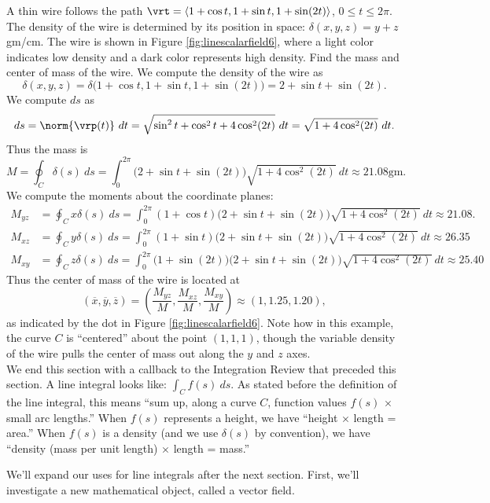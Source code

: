 {A thin wire follows the path $\vrt = \langle 1+\cos t,1+\sin t, 1+ \sin(2t)\rangle$, $0\leq t\leq 2\pi$. The density of the wire is determined by its position in space: $\delta(x,y,z) = y+z$ gm/cm. The wire is shown in Figure \ref{fig:linescalarfield6}, where a light color indicates low density and a dark color represents high density. Find the mass  and center of mass of the wire.
}
{We compute the density of the wire as 
$$\delta(x,y,z) = \delta\big(1+\cos t,1+\sin t, 1+\sin(2t)\big) = 2+\sin t+\sin(2t).$$ We compute $ds$ as
$$ds = \norm{\vrp(t)}\ dt = \sqrt{\sin^2t+\cos^2t+4\cos^2(2t)}\ dt = \sqrt{1+4\cos^2(2t)}\ dt.$$
Thus the mass is
$$M = \oint_C \delta(s)\ ds = \int_0^{2\pi} \big(2+\sin t+\sin(2t)\big)\sqrt{1+4\cos^2(2t)}\ dt \approx 21.08\text{gm}. $$
We compute the moments about the coordinate planes:
\begin{align*}
M_{yz} &= \oint_C x\delta(s)\ ds = \int_0^{2\pi}(1+\cos t)\big(2+\sin t+\sin(2t)\big)\sqrt{1+4\cos^2(2t)}\ dt \approx 21.08. \\
M_{xz} &= \oint_C y\delta(s)\ ds = \int_0^{2\pi}(1+\sin t)\big(2+\sin t+\sin(2t)\big)\sqrt{1+4\cos^2(2t)}\ dt \approx
26.35\\
M_{xy} &= \oint_C z\delta(s)\ ds = \int_0^{2\pi}\big(1+\sin(2 t)\big)\big(2+\sin t+\sin(2t)\big)\sqrt{1+4\cos^2(2t)}\ dt \approx 25.40
\end{align*}
Thus the center of mass of the wire is located at 
$$(\overline{x},\overline{y},\overline{z}) = \left(\frac{M_{yz}}M, \frac{M_{xz}}M,\frac{M_{xy}}M\right) \approx (1,1.25,1.20),$$
as indicated by the dot in Figure \ref{fig:linescalarfield6}. Note how in this example, the curve $C$ is ``centered'' about the point $(1,1,1)$, though the variable density of the wire pulls the center of mass out along the $y$ and $z$ axes.
}\\

We end this section with a callback to the Integration Review that preceded this section. A line integral looks like: $\int_C f(s)\ ds$. As stated before the definition of the line integral, this means ``sum up, along a curve $C$, function values $f(s)$ $\times$ small arc lengths.'' When $f(s)$ represents a height, we have ``height $\times$ length = area.'' When $f(s)$ is a density (and we use $\delta(s)$ by convention), we have ``density (mass per unit length) $\times$ length = mass.''

We'll expand our uses for line integrals after the next section. First, we'll investigate a new mathematical object, called a vector field.

